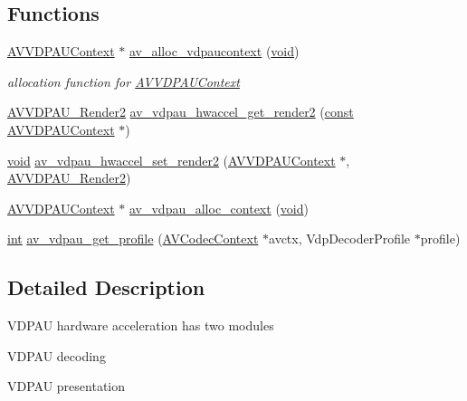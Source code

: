 \subsection*{Functions}
\begin{DoxyCompactItemize}
\item 
\hyperlink{struct_a_v_v_d_p_a_u_context}{A\+V\+V\+D\+P\+A\+U\+Context} $\ast$ \hyperlink{group__lavc__codec__hwaccel__vdpau_gabd46596564db27b9783814b2942f6d84}{av\+\_\+alloc\+\_\+vdpaucontext} (\hyperlink{sound_8c_ae35f5844602719cf66324f4de2a658b3}{void})
\begin{DoxyCompactList}\small\item\em allocation function for \hyperlink{struct_a_v_v_d_p_a_u_context}{A\+V\+V\+D\+P\+A\+U\+Context} \end{DoxyCompactList}\item 
\hyperlink{group__lavc__codec__hwaccel__vdpau_ga1f243045ef2673ebe2a50a8431f3dfa7}{A\+V\+V\+D\+P\+A\+U\+\_\+\+Render2} \hyperlink{group__lavc__codec__hwaccel__vdpau_ga0a3496e46e9dfcd50f7baa96a9da0275}{av\+\_\+vdpau\+\_\+hwaccel\+\_\+get\+\_\+render2} (\hyperlink{getopt1_8c_a2c212835823e3c54a8ab6d95c652660e}{const} \hyperlink{struct_a_v_v_d_p_a_u_context}{A\+V\+V\+D\+P\+A\+U\+Context} $\ast$)
\item 
\hyperlink{sound_8c_ae35f5844602719cf66324f4de2a658b3}{void} \hyperlink{group__lavc__codec__hwaccel__vdpau_ga5d993c664b580bb5b927e46c34455cf6}{av\+\_\+vdpau\+\_\+hwaccel\+\_\+set\+\_\+render2} (\hyperlink{struct_a_v_v_d_p_a_u_context}{A\+V\+V\+D\+P\+A\+U\+Context} $\ast$, \hyperlink{group__lavc__codec__hwaccel__vdpau_ga1f243045ef2673ebe2a50a8431f3dfa7}{A\+V\+V\+D\+P\+A\+U\+\_\+\+Render2})
\item 
\hyperlink{struct_a_v_v_d_p_a_u_context}{A\+V\+V\+D\+P\+A\+U\+Context} $\ast$ \hyperlink{group__lavc__codec__hwaccel__vdpau_gac3b2e926326d9bc7c4a856304c4bc0f8}{av\+\_\+vdpau\+\_\+alloc\+\_\+context} (\hyperlink{sound_8c_ae35f5844602719cf66324f4de2a658b3}{void})
\item 
\hyperlink{xmltok_8h_a5a0d4a5641ce434f1d23533f2b2e6653}{int} \hyperlink{group__lavc__codec__hwaccel__vdpau_gaa5dd9ae3912059bdb13f88ddfda26657}{av\+\_\+vdpau\+\_\+get\+\_\+profile} (\hyperlink{struct_a_v_codec_context}{A\+V\+Codec\+Context} $\ast$avctx, Vdp\+Decoder\+Profile $\ast$profile)
\end{DoxyCompactItemize}


\subsection{Detailed Description}
V\+D\+P\+AU hardware acceleration has two modules
\begin{DoxyItemize}
\item V\+D\+P\+AU decoding
\item V\+D\+P\+AU presentation
\end{DoxyItemize}

